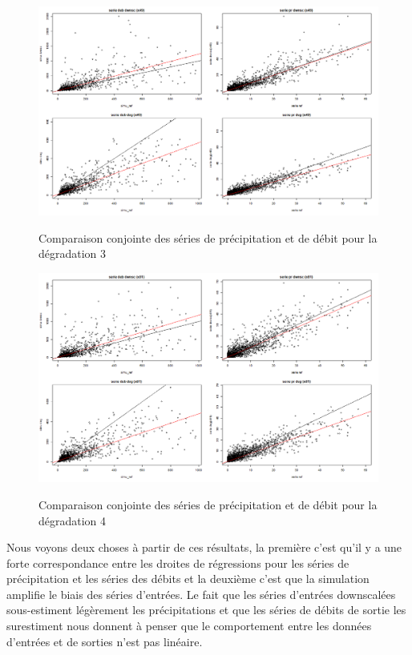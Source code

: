 \documentclass[a4paper,11pt]{article}
\numberwithin{equation}{section}
\begin{document}
\begin{figure}[H]
	\begin{center}
		\includegraphics[scale=0.35]{images/multi_comparaison_4.png}\\
	\end{center}
\caption{Comparaison conjointe des séries de précipitation et de débit pour la dégradation 3}
\end{figure} 
\begin{figure}[H]
	\begin{center}
		\includegraphics[scale=0.35]{images/multi_comparaison_5.png}\\
	\end{center}
\caption{Comparaison conjointe des séries de précipitation et de débit pour la dégradation 4}
\end{figure} 

Nous voyons deux choses à partir de ces résultats, la première c'est qu'il y a une forte correspondance entre les droites de régressions pour les séries de précipitation et les séries des débits et la deuxième c'est que la simulation amplifie le biais des séries d'entrées. Le fait que les séries d'entrées downscalées sous-estiment légèrement les précipitations et que les séries de débits de sortie les surestiment nous donnent à penser que le comportement entre les données d'entrées et de sorties n'est pas linéaire.
 
\end{document}
